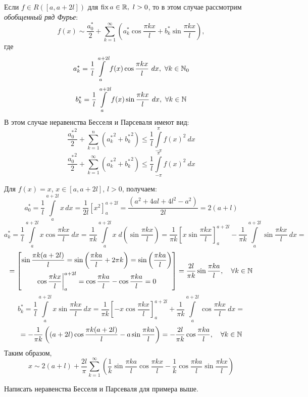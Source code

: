 \documentclass[../../main.tex]{subfiles}
\begin{document}
	Если $f \in R\left( [a,a+2l]\right)$ для $\operatorname{fix} a \in \mathbb{R},\ l > 0$, то в 
	этом случае рассмотрим \emph{обобщенный ряд Фурье}:
	\begin{equation}
	\label{17:25}
	 f(x) \sim \frac{a_0^*}{2} + \sum_{k=1}^{\infty} \left( a_k^* \cos{\frac{\pi 
	 k x}{l}} + b_k^* \sin{\frac{\pi k x}{l}} \right),
	\end{equation}
	где
	\begin{equation}
	\label{17:26}
	a_k^* = \frac{1}{l} \int\limits_{a}^{a+2l} f(x) \cos{\frac{\pi k x}{l}} \ 
	dx,\ 
	\forall k \in \N_0
	\end{equation}
	\begin{equation}
	\label{17:27}
	b_k^* = \frac{1}{l} \int\limits_{a}^{a+2l} f(x) \sin{\frac{\pi k x}{l}} \ 
	dx,\ 
	\forall k \in \N
	\end{equation}
	В этом случае неравенства Бесселя и Парсеваля имеют вид:
	\begin{equation}
	\label{17:28}
	\frac{{a_0^*}^2}{2} + \sum_{k=1}^{n} \left( {a_k^*}^2 + {b_k^*}^2\right) \le 
	\frac{1}{l}  \int\limits_{-\pi}^{\pi} f(x)^2 \ dx
	\end{equation}
	\begin{equation}
	\label{17:29}
	\frac{{a_0^*}^2}{2} + \sum_{k=1}^{\infty} \left( {a_k^*}^2 + {b_k^*}^2\right) 
	\le \frac{1}{l}  \int\limits_{-\pi}^{\pi} f(x)^2 \ dx
	\end{equation}
	\begin{exmp}
	Для $f(x) = x$, $x \in [a,a+2l]$, $l > 0$, получаем:
	\[ a_0^* = \frac{1}{l} \int\limits_{a}^{a+2l} x\, dx = \frac{1}{2l} \left[x^2 
	\right]_{a}^{a+2l} = \frac{\left( a^2 + 4al + 4l^2 - a^2 \right) }{2l}=2(a+l) 
	 \]
	\[  a_k^* = \frac{1}{l} \int\limits_{a}^{a+2l} x \cos{\frac{\pi k x}{l}} \ dx 
	= \frac{1}{\pi k}  \int\limits_{a}^{a+2l} x \; d \left(\sin{\frac{\pi k 
	x}{l}} 
	\right) = \frac{1}{\pi k} \left[ x \sin{\frac{\pi k x}{l}} \right]_{a}^{a+2l} 
	- \frac{1}{\pi k} \int\limits_{a}^{a+2l} \sin{\frac{\pi k x}{l}} \ dx =\]
	\[ = \left[ \begin{gathered} 
	\sin{\frac{\pi k (a+2l)}{l}} = \sin{\left( \frac{\pi k a}{l} + 2\pi k\right)} 
	= \sin{\left( \frac{\pi k a}{l} \right)}  \\
	\cos{ \frac{\pi k x}{l} } \bigg|_{a}^{a+2l} = \cos{ \frac{\pi k a}{l} } - 
	\cos{ \frac{\pi k a}{l} } = 0
	\end{gathered}\right] =\frac{2l}{\pi k} \sin{\frac{\pi k a}{l}}, \quad 
	\forall k \in \mathbb{N}     \]
	\[  b_k^* = \frac{1}{l} \int\limits_{a}^{a+2l} x \sin{\frac{\pi k x}{l}} \ dx 
	= \frac{1}{\pi k} \left[ - x \cos{\frac{\pi k x}{l}} \right]_{a}^{a+2l} + 
	\frac{1}{\pi k} \int\limits_{a}^{a+2l} \cos{\frac{\pi k x}{l}} \ dx =         
	   \]
	\[= - \frac{1}{\pi k} \left( \left(a+2l \right)\cos{\frac{\pi k (a+2l)}{l}} - 
	a \sin{\frac{\pi k a}{l}} \right)  = -\frac{2l}{\pi k} \cos{\frac{\pi k 
	a}{l}}, \quad \forall k \in \mathbb{N}     \]
	Таким образом,
	\[ x \sim 2(a+l) + \frac{2l}{\pi} \sum_{k=1}^{\infty}\left(  \frac{1}{k} 
	\sin{\frac{\pi k a}{l}} \cos{\frac{\pi k x}{l}} - \frac{1}{k} \cos{\frac{\pi 
	k a}{l}} \sin{\frac{\pi k x}{l}} \right) \]
	\end{exmp}
	\begin{exercise}
		Написать неравенства Бесселя и Парсеваля для примера выше.
	\end{exercise}
\end{document}
